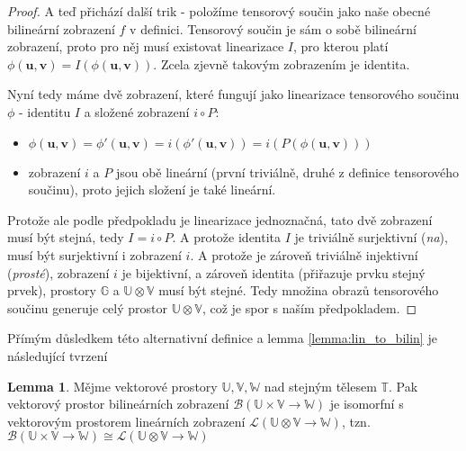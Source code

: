 \documentclass[a5paper,12pt]{amsbook}
\theoremstyle{definition}
\newtheorem{lemma}[theorem]{Lemma}
\newcommand{\myvec}[1]{\mathbf{#1}}
\newcommand{\myspace}[1]{\mathbb{#1}}
\begin{document}
\begin{proof}
A teď přichází další trik - položíme tensorový součin jako naše obecné bilineární zobrazení
$f$ v definici. Tensorový součin je sám o sobě bilineární zobrazení, proto pro něj musí existovat
linearizace $I$, pro kterou platí $\phi(\myvec{u}, \myvec{v}) = I(\phi(\myvec{u}, \myvec{v}))$.
Zcela zjevně takovým zobrazením je identita.

Nyní tedy máme dvě zobrazení, které fungují jako linearizace tensorového součinu $\phi$ - identitu
$I$ a složené zobrazení $i \circ P$:
\begin{itemize}
\item $\phi(\myvec{u}, \myvec{v}) = \phi'(\myvec{u}, \myvec{v}) = i(\phi'(\myvec{u}, \myvec{v}))
    = i(P(\phi(\myvec{u}, \myvec{v})))$
\item zobrazení $i$ a $P$ jsou obě lineární (první triviálně, druhé z definice tensorového součinu),
    proto jejich složení je také lineární.
\end{itemize}
Protože ale podle předpokladu je linearizace jednoznačná, tato dvě zobrazení musí být stejná,
tedy $I = i \circ P$. A protože identita $I$ je triviálně surjektivní (\textit{na}), musí být
surjektivní i zobrazení $i$. A protože je zároveň triviálně injektivní (\textit{prosté}), zobrazení
$i$ je bijektivní, a zároveň identita (přiřazuje prvku stejný prvek), prostory $\myspace{G}$
a $\myspace{U}\otimes\myspace{V}$ musí být stejné. Tedy množina obrazů tensorového součinu generuje
celý prostor $\myspace{U}\otimes\myspace{V}$, což je spor s naším předpokladem.
\end{proof}

\noindent
Přímým důsledkem této alternativní definice a lemma \ref{lemma:lin_to_bilin} je následující
tvrzení

\begin{lemma}
Mějme vektorové prostory $\myspace{U}, \myspace{V}, \myspace{W}$ nad stejným tělesem $\myspace{T}$.
Pak vektorový prostor bilineárních zobrazení
$\mathcal{B}(\myspace{U}\times\myspace{V}\rightarrow\myspace{W})$
je isomorfní s vektorovým prostorem lineárních zobrazení
$\mathcal{L}(\myspace{U}\otimes\myspace{V}\rightarrow\myspace{W})$, tzn.
$\mathcal{B}(\myspace{U}\times\myspace{V}\rightarrow\myspace{W}) \cong
\mathcal{L}(\myspace{U}\otimes\myspace{V}\rightarrow\myspace{W})$
\end{lemma}
\end{document}
